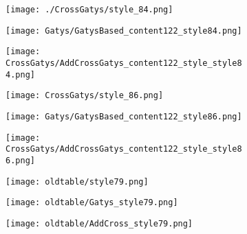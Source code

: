 \begin{figure}[!htbp]
    \centering
    \begin{subfigure}[b]{0.3\linewidth}
      \texttt{[image: ./CrossGatys/style\_84.png]}
    \end{subfigure}
    \begin{subfigure}[b]{0.3\linewidth}
      \texttt{[image: Gatys/GatysBased\_content122\_style84.png]}
    \end{subfigure}
    \begin{subfigure}[b]{0.3\linewidth}
      \texttt{[image: CrossGatys/AddCrossGatys\_content122\_style\_style84.png]}
    \end{subfigure}
  
  
    \begin{subfigure}[b]{0.3\linewidth}
      \texttt{[image: CrossGatys/style\_86.png]}
    \end{subfigure}
    \begin{subfigure}[b]{0.3\linewidth}
      \texttt{[image: Gatys/GatysBased\_content122\_style86.png]}
    \end{subfigure}
    \begin{subfigure}[b]{0.3\linewidth}
      \texttt{[image: CrossGatys/AddCrossGatys\_content122\_style\_style86.png]}
    \end{subfigure}
    
    
    \begin{subfigure}[b]{0.3\linewidth}
      \texttt{[image: oldtable/style79.png]}
    \end{subfigure}
    \begin{subfigure}[b]{0.3\linewidth}
      \texttt{[image: oldtable/Gatys\_style79.png]}
    \end{subfigure}
    \begin{subfigure}[b]{0.3\linewidth}
      \texttt{[image: oldtable/AddCross\_style79.png]}
    \end{subfigure}  
    

\end{figure}

